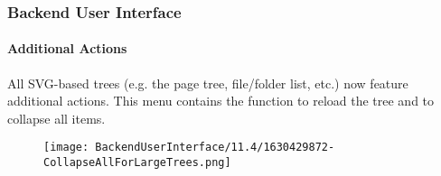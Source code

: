 %

\begin{frame}[fragile]
	\frametitle{Backend User Interface}
	\framesubtitle{Additional Actions}

	All SVG-based trees (e.g. the page tree, file/folder list, etc.) now feature
	additional actions. This menu contains the function to reload the tree and
	to collapse all items.

	\begin{figure}
		\texttt{[image: BackendUserInterface/11.4/1630429872-CollapseAllForLargeTrees.png]}
	\end{figure}

\end{frame}

